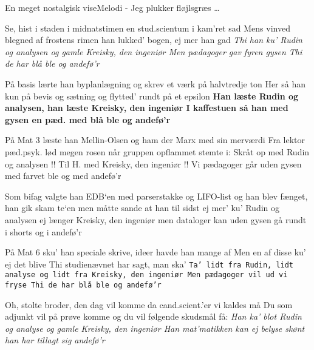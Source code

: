 \begin{sang}{En meget nostalgisk vise}{Melodi - Jeg plukker fløjlsgræs \ldots}
\begin{vers}
Se, hist i staden i midnatstimen
en stud.scientum i kam'ret sad
Mens vinved blegned af frostens rimen
han lukked' bogen, ej mer han gad
{\sl Thi han ku' Rudin og analysen
og gamle Kreisky, den ingeniør
Men pædagoger gav fyren gysen
Thi de har blå ble og andefø'r}
\end{vers}
\begin{vers}
På basis lærte han byplanlægning
og skrev et værk på halvtredje ton
Her så han kun på bevis og sætning
og flytted' rundt på et epsilon
{\bf Han læste Rudin og analysen,
han læste Kreisky, den ingeniør
I kaffestuen så han med gysen
en pæd. med blå ble og andefø'r }
\end{vers}
\begin{vers}
På Mat 3 læste han Mellin-Olsen
og ham der Marx med sin merværdi
Fra lektor pæd.psyk. lød megen rosen
når gruppen opflammet stemte i:
{\sf Skråt op med Rudin og analysen !!
Til H. med Kreisky, den ingeniør !!
Vi pædagoger går uden gysen
med farvet ble og med andefø'r }
\end{vers}
\vbox{}\vfill
\begin{vers}
Som bifag valgte han EDB`en
med parserstakke og LIFO-list
og han blev fænget, han gik skam te`en
men måtte sande at han til sidst
{\sc ej mer' ku' Rudin og analysen
ej længer Kreisky, den ingeniør
men dataloger kan uden gysen
gå rundt i shorts og i andefø'r}
\end{vers}
\begin{vers}
På Mat 6 sku' han speciale skrive,
ideer havde han mange af
Men en af disse ku' ej det blive
Thi studienævnet har sagt, man ska' \vspace{1mm}
{\tt \small Ta' lidt fra Rudin, lidt analyse
og lidt fra Kreisky, den ingeniør
Men pædagoger vil ud vi fryse
Thi de har blå ble og andefø'r }
\end{vers}
\begin{vers}
Oh, stolte broder, den dag vil komme
da cand.scient.'er vi kaldes må
Du som adjunkt vil på prøve komme
og du vil følgende skudsmål få:
{\em Han ka' blot Rudin og analyse
og gamle Kreisky, den ingeniør
Han mat'matikken kan ej belyse
skønt han har tillagt sig andefø'r }
\end{vers}
\laps
\end{sang}
